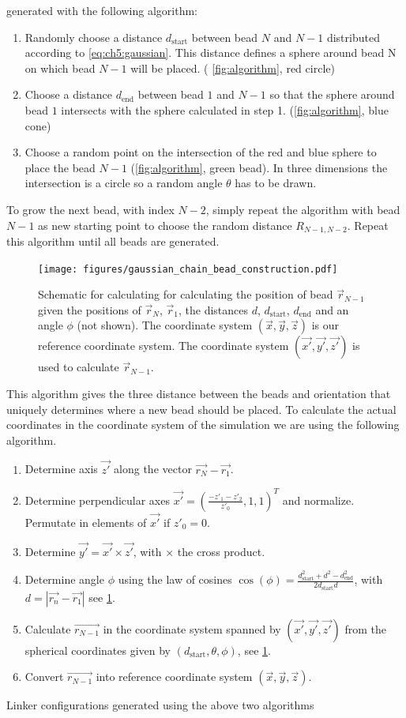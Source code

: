 \documentclass[12pt, twoside]{report}
\begin{document}
generated with the following algorithm:
\begin{enumerate}
\item Randomly choose a distance \(d_{\mathrm{start}}\) between bead $N$ and
$N-1$ distributed according to \cref{eq:ch5:gaussian}. This distance defines a
sphere around bead N on which bead \(N-1\) will be placed. (
\cref{fig:algorithm}, red circle)
\item Choose a distance \(d_{\mathrm{end}}\) between bead $1$ and $N-1$ so that
the sphere around bead $1$ intersects with the sphere calculated in step 1.
(\cref{fig:algorithm}, blue cone)
\item Choose a random point on the intersection of the red and blue sphere to
place the bead \(N-1\) (\cref{fig:algorithm}, green bead). In three dimensions
the intersection is a circle so a random angle $\theta$ has to be drawn.
\end{enumerate} To grow the next bead, with index $N-2$, simply repeat the
algorithm with bead $N-1$ as new starting point to choose the random distance
\(R_{N-1,N-2}\). Repeat this algorithm until all beads are generated.
\begin{figure}[!ht] \centering
\texttt{[image: figures/gaussian\_chain\_bead\_construction.pdf]}
\caption[Illustration of generating bead positions for a Gaussian polymer
model.]{Schematic for calculating for calculating the position of bead
$\vec{r}_{N-1}$ given the positions of $\vec{r}_N$, $\vec{r}_1$, the distances
$d$, $d_{\mathrm{start}}$, $d_{\mathrm{end}}$ and an angle $\phi$ (not shown).
The coordinate system $(\vec{x}, \vec{y}, \vec{z})$ is our reference coordinate
system. The coordinate system $(\vec{x'}, \vec{y'}, \vec{z'})$ is used to
calculate $\vec{r}_{N-1}$.}
\label{fig:bead-construction}
\end{figure} This algorithm gives the three distance between the beads and
orientation that uniquely determines where a new bead should be placed. To
calculate the actual coordinates in the coordinate system of the simulation we
are using the following algorithm.
\begin{enumerate}
  \item Determine axis $\vec{z'}$ along the vector $\vec{r_N} - \vec{r_1}$.
  \item Determine perpendicular axes $\vec{x'}=\left(\frac{-z'_1-z'_2}{z'_0},1,
1\right)^T$ and normalize. Permutate in elements of $\vec{x'}$ if $z'_0=0$.
  \item Determine $\vec{y'} = \vec{x'} \times \vec{z'}$, with \(\times\) the
cross product.
  \item Determine angle \(\phi\) using the law of cosines
$\cos(\phi)=\frac{d_{\mathrm{start}}^2 + d^2 - d_{\mathrm{end}}^2}{ 2
d_{\mathrm{start}} d}$, with $d=|\vec{r_n} - \vec{r_1}|$ see
\cref{fig:bead-construction}.
  \item Calculate $\vec{r_{N-1}}$ in the coordinate system spanned by
$(\vec{x'}, \vec{y'}, \vec{z'})$ from the spherical coordinates given by
$(d_{\mathrm{start}}, \theta, \phi)$, see \cref{fig:bead-construction}.
  \item Convert $\vec{r_{N-1}}$ into reference coordinate system $(\vec{x},
\vec{y}, \vec{z})$.
\end{enumerate} Linker configurations generated using the above two algorithms
\end{document}
